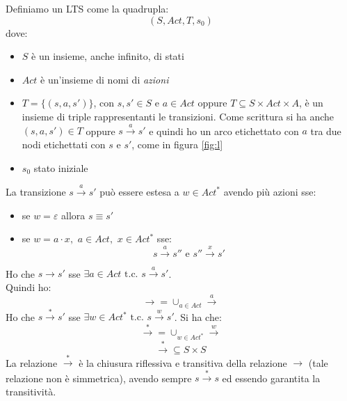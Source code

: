 \documentclass[a4paper,12pt, oneside]{book}
\begin{document}
\begin{definizione}
  Definiamo un LTS come la quadrupla:
  \[(S, Act, T, s_0)\]
  dove:
  \begin{itemize}
    \item $S$ è un insieme, anche infinito, di stati
    \item $Act$ è un'insieme di nomi di \textit{azioni}
    \item $T=\{(s,a,s')\}$, con $s,s'\in S$ e $a\in Act$ oppure $T\subseteq
    S\times Act\times A$, è un insieme di triple rappresentanti le
    transizioni. Come scrittura si ha anche $(s,a,s')\in T$ oppure
    $s\stackrel{a}{\rightarrow} s'$ e quindi ho un arco etichettato con $a$ tra
    due nodi etichettati con $s$ e $s'$, come in figura \ref{fig:l}
    \item $s_0$ stato iniziale
  \end{itemize}
  La transizione $s\stackrel{a}{\rightarrow} s'$ può essere estesa a $w\in
  Act^*$ avendo più azioni sse:
  \begin{itemize}
    \item se $w=\varepsilon$ allora $s\equiv s'$
    \item se $w=a\cdot x,\,\,a\in Act,\,\,x\in Act^*$ sse:
    \[s\stackrel{a}{\rightarrow} s'' \mbox{ e } s''\stackrel{x}{\rightarrow}
      s'\]
  \end{itemize}
  Ho che $s\rightarrow s'$ sse $\exists a \in Act \mbox{ t.c. }
  s\stackrel{a}{\rightarrow} s'$.\\
  Quindi ho:
  \[\rightarrow =\cup_{a\in Act}\stackrel{a}{\rightarrow}\]
  Ho che $s\stackrel{*}{\rightarrow} s'$ sse $\exists w\in Act^*\mbox{ t.c. }
  s\stackrel{w}{\rightarrow} s'$. Si ha che:
  \[\stackrel{*}{\rightarrow}=\cup_{w\in Act^*}\stackrel{w}{\rightarrow}\]
  \[\stackrel{*}{\rightarrow}\subseteq S\times S\]
  La relazione $\stackrel{*}{\rightarrow}$ è la chiusura riflessiva e transitiva
  della relazione $\rightarrow$ (tale relazione non è simmetrica), avendo sempre
  $s\stackrel{*}{\rightarrow}s$ ed essendo garantita la transitività.
\end{definizione}
\end{document}
